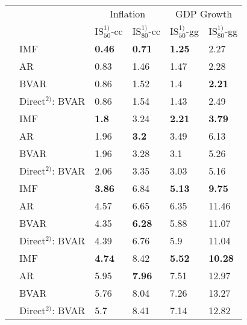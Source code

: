 \begin{table}[!h]
\centering
\begin{tabular}{llllll}
\toprule
\multicolumn{2}{c}{ } & \multicolumn{2}{c}{{Inflation}} & \multicolumn{2}{c}{{GDP Growth}} \\
\cmidrule(l{3pt}r{3pt}){3-4} \cmidrule(l{3pt}r{3pt}){5-6}
 &  & $\text{IS}_{50}^{1)}$-cc & $\text{IS}_{80}^{1)}$-cc & $\text{IS}_{50}^{1)}$-gg & $\text{IS}_{80}^{1)}$-gg\\
\midrule
 & IMF & \textbf{0.46} & \textbf{0.71} & \textbf{1.25} & 2.27\\
\parbox[t]{2mm}{}
 & AR & 0.83 & 1.46 & 1.47 & 2.28\\
 & BVAR & 0.86 & 1.52 & 1.4 & \textbf{2.21}\\
 & Direct$^{2)}$: BVAR & 0.86 & 1.54 & 1.43 & 2.49\\
\addlinespace
 & IMF & \textbf{1.8} & 3.24 & \textbf{2.21} & \textbf{3.79}\\
\parbox[t]{2mm}{}
 & AR & 1.96 & \textbf{3.2} & 3.49 & 6.13\\
 & BVAR & 1.96 & 3.28 & 3.1 & 5.26\\
 & Direct$^{2)}$: BVAR & 2.06 & 3.35 & 3.03 & 5.16\\
\addlinespace
 & IMF & \textbf{3.86} & 6.84 & \textbf{5.13} & \textbf{9.75}\\
\parbox[t]{2mm}{}
 & AR & 4.57 & 6.65 & 6.35 & 11.46\\
 & BVAR & 4.35 & \textbf{6.28} & 5.88 & 11.07\\
 & Direct$^{2)}$: BVAR & 4.39 & 6.76 & 5.9 & 11.04\\
\addlinespace
 & IMF & \textbf{4.74} & 8.42 & \textbf{5.52} & \textbf{10.28}\\
\parbox[t]{2mm}{}
 & AR & 5.95 & \textbf{7.96} & 7.51 & 12.97\\
 & BVAR & 5.76 & 8.04 & 7.26 & 13.27\\
 & Direct$^{2)}$: BVAR & 5.7 & 8.41 & 7.14 & 12.82\\
\bottomrule
\end{tabular}
\end{table}
